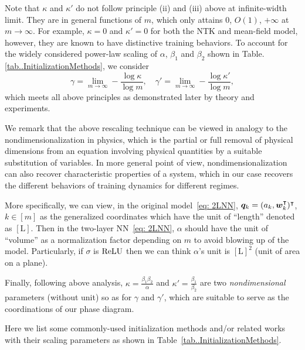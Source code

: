 \documentclass{article}
\begin{document}
Note that $\kappa$ and $\kappa'$ do not follow principle (ii) and (iii) above at infinite-width limit. They are in general functions of $m$, which only attains $0$, $O(1)$, $+\infty$ at $m\to\infty$. For example, $\kappa=0$ and $\kappa'=0$ for both the NTK and mean-field model, however, they are known to have distinctive training behaviors. To account for the widely considered power-law scaling of $\alpha$, $\beta_1$ and $\beta_2$ shown in Table. \ref{tab..InitializationMethods}, we consider 
\begin{equation}
    \gamma=\lim_{m\to\infty}-\frac{\log \kappa}{\log m}, \quad \gamma'=\lim_{m\to\infty}-\frac{\log\kappa'}{\log m},
\end{equation}
 which meets all above principles as demonstrated later by theory and experiments.

\begin{rmk}
    We remark that the above rescaling technique can be viewed in analogy to the nondimensionalization in physics, which is the partial or full removal of physical dimensions from an equation involving physical quantities by a suitable substitution of variables. In more general point of view, nondimensionalization can also recover characteristic properties of a system, which in our case recovers the different behaviors of training dynamics for different regimes.

    More specifically, we can view, in the original model~\eqref{eq: 2LNN}, $\bm{q}_k=(a_k,\bm{w}_k^{\intercal})^\intercal$, $k\in[m]$ as the generalized coordinates which have the unit of ``length'' denoted as $[\mathrm{L}]$. Then in the two-layer NN~\eqref{eq: 2LNN}, $\alpha$ should have the unit of ``volume'' as a normalization factor depending on $m$ to avoid blowing up of the model. Particularly, if $\sigma$ is $\mathrm{ReLU}$ then we can think $\alpha$'s unit is $[\mathrm{L}]^2$ (unit of area on a plane).

    Finally, following above analysis, $\kappa=\frac{\beta_1\beta_2}{\alpha}$ and $\kappa'=\frac{\beta_1}{\beta_2}$ are two \emph{nondimensional} parameters (without unit) so as for $\gamma$ and $\gamma'$, which are suitable to serve as the coordinations of our phase diagram.
\end{rmk}
\begin{rmk}
    Here we list some commonly-used initialization methods and/or related works with their scaling parameters as shown in Table~\ref{tab..InitializationMethods}.
\end{rmk}
\end{document}
